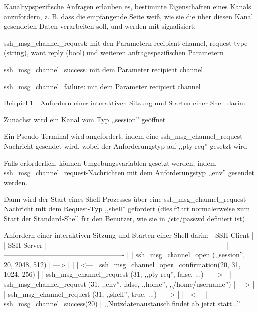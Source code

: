 \documentclass[a4paper]{article}
\begin{document}
\begin{multicols}{3}
\begin{itemize*}
\begin{itemize*}
\begin{itemize*}
                  \end{itemize*}
                  \item Kanaltypspezifische Anfragen erlauben es, bestimmte Eigenschaften
                  eines Kanals anzufordern, z. B. dass die empfangende Seite weiß, wie
                  sie die über diesen Kanal gesendeten Daten verarbeiten soll, und
                  werden mit signalisiert:
                  \begin{itemize*}
                        \item ssh\_msg\_channel\_request: mit den Parametern recipient channel, request type (string), want reply (bool) und weiteren anfragespezifischen Parametern
                        \item ssh\_msg\_channel\_success: mit dem Parameter recipient channel
                        \item ssh\_msg\_channel\_failure: mit dem Parameter recipient channel
                  \end{itemize*}
                  \item Beispiel 1 - Anfordern einer interaktiven Sitzung und Starten einer
                  Shell darin:
                  \begin{itemize*}
                        \item Zunächst wird ein Kanal vom Typ ,,session'' geöffnet
                        \item Ein Pseudo-Terminal wird angefordert, indem eine ssh\_msg\_channel\_request-Nachricht gesendet wird, wobei der Anforderungstyp auf ,,pty-req'' gesetzt wird
                        \item Falls erforderlich, können Umgebungsvariablen gesetzt werden, indem ssh\_msg\_channel\_request-Nachrichten mit dem Anforderungstyp ,,env'' gesendet werden.
                        \item Dann wird der Start eines Shell-Prozesses über eine ssh\_msg\_channel\_request-Nachricht mit dem Request-Typ ,,shell'' gefordert (dies führt normalerweise zum Start der Standard-Shell für den Benutzer, wie sie in /etc/passwd definiert ist)
                        \item Anfordern einer interaktiven Sitzung und Starten einer Shell darin: | SSH Client | | SSH Server | | -------------------------------------------------------------------------- | ---- | ---------------------------------------------------- | | ssh\_msg\_channel\_open (,,session'', 20, 2048, 512) | --->{} | | | \textless--- | ssh\_msg\_channel\_open\_confirmation(20, 31, 1024, 256) | | ssh\_msg\_channel\_request (31, ,,pty-req'', false, ...) | --->{} | | ssh\_msg\_channel\_request (31, ,,env'', false, ,,home'', ,,/home/username'') | --->{} | | ssh\_msg\_channel\_request (31, ,,shell'', true, ...) | --->{} | | | \textless--- | ssh\_msg\_channel\_success(20) |
                        ,,Nutzdatenaustausch findet ab jetzt statt...''
                  \end{itemize*}
            \end{itemize*}


\end{itemize*}
\end{multicols}
\end{document}

